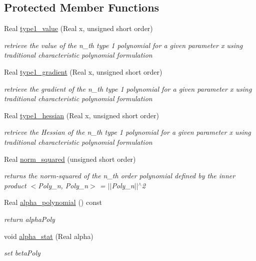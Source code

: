 \subsection*{Protected Member Functions}
\begin{DoxyCompactItemize}
\item 
Real \hyperlink{classPecos_1_1CharlierOrthogPolynomial_a8792a858ac05a2158880e876f9da2019}{type1\+\_\+value} (Real x, unsigned short order)
\begin{DoxyCompactList}\small\item\em retrieve the value of the n\+\_\+th type 1 polynomial for a given parameter x using traditional characteristic polynomial formulation \end{DoxyCompactList}\item 
Real \hyperlink{classPecos_1_1CharlierOrthogPolynomial_aac6751aa35bf5fcb42c520a322fc26dc}{type1\+\_\+gradient} (Real x, unsigned short order)
\begin{DoxyCompactList}\small\item\em retrieve the gradient of the n\+\_\+th type 1 polynomial for a given parameter x using traditional characteristic polynomial formulation \end{DoxyCompactList}\item 
Real \hyperlink{classPecos_1_1CharlierOrthogPolynomial_ae957c8c2e7ea13728bafbad0c9b2996e}{type1\+\_\+hessian} (Real x, unsigned short order)
\begin{DoxyCompactList}\small\item\em retrieve the Hessian of the n\+\_\+th type 1 polynomial for a given parameter x using traditional characteristic polynomial formulation \end{DoxyCompactList}\item 
Real \hyperlink{classPecos_1_1CharlierOrthogPolynomial_a77c0dbb874af1190d448d01da6efbe4e}{norm\+\_\+squared} (unsigned short order)
\begin{DoxyCompactList}\small\item\em returns the norm-\/squared of the n\+\_\+th order polynomial defined by the inner product $<$Poly\+\_\+n, Poly\+\_\+n$>$ = $\vert$$\vert$\+Poly\+\_\+n$\vert$$\vert$$^\wedge$2 \end{DoxyCompactList}\item 
Real \hyperlink{classPecos_1_1CharlierOrthogPolynomial_a997bdeddf670667c476513fcacc779ca}{alpha\+\_\+polynomial} () const \label{classPecos_1_1CharlierOrthogPolynomial_a997bdeddf670667c476513fcacc779ca}

\begin{DoxyCompactList}\small\item\em return alpha\+Poly \end{DoxyCompactList}\item 
void \hyperlink{classPecos_1_1CharlierOrthogPolynomial_aeeb4ce11a8d413209be1ec08eced8728}{alpha\+\_\+stat} (Real alpha)\label{classPecos_1_1CharlierOrthogPolynomial_aeeb4ce11a8d413209be1ec08eced8728}

\begin{DoxyCompactList}\small\item\em set beta\+Poly \end{DoxyCompactList}\end{DoxyCompactItemize}
